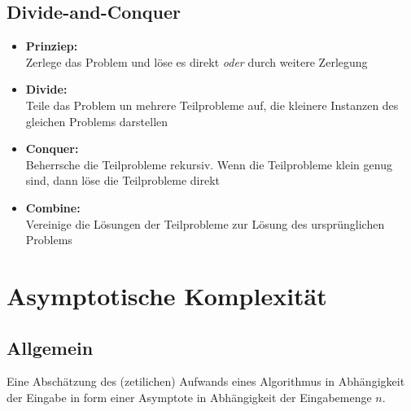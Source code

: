 	\subsection{Divide-and-Conquer}
		\begin{itemize}
			\item \textbf{Prinziep:} \\
				Zerlege das Problem und löse es direkt \textit{oder} durch weitere Zerlegung
			\item \textbf{Divide:} \\
				Teile das Problem un mehrere Teilprobleme auf, die kleinere Instanzen des gleichen Problems darstellen
			\item \textbf{Conquer:} \\
				Beherrsche die Teilprobleme rekursiv. Wenn die Teilprobleme klein genug sind, dann löse die Teilprobleme direkt
			\item \textbf{Combine:} \\
				Vereinige die Lösungen der Teilprobleme zur Lösung des ursprünglichen Problems
		\end{itemize}


\newpage
\section{Asymptotische Komplexität}
	\subsection{Allgemein}
		Eine Abschätzung des (zetilichen) Aufwands eines Algorithmus in Abhängigkeit der Eingabe
		in form einer Asymptote in Abhängigkeit der Eingabemenge $n$.

